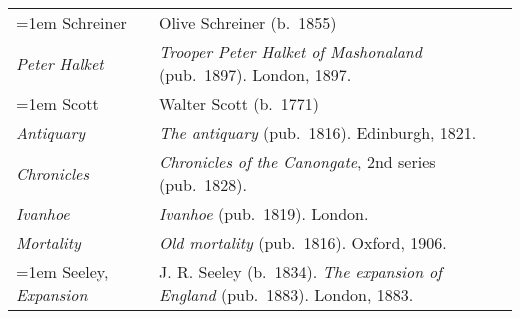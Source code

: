 \begin{xltabular}{\textwidth}{ lQ }
\hangindent=1em  Schreiner & Olive Schreiner (b.~1855) \\
\hspace{1em}\textit{Peter Halket} & \textit{Trooper Peter Halket of Mashonaland} (pub.~1897). London, 1897.\\

\hangindent=1em  Scott & Walter Scott (b.~1771) \\
\hspace{1em}\textit{Antiquary} & \textit{The antiquary} (pub.~1816). Edinburgh, 1821.  \\
\hspace{1em}\textit{Chronicles} & \textit{Chronicles of the Canongate}, 2nd series (pub.~1828). \\
\hspace{1em}\textit{Ivanhoe} & \textit{Ivanhoe} (pub.~1819). London. \\
\hspace{1em}\textit{Mortality} & \textit{Old mortality} (pub.~1816). Oxford, 1906. \\ %

\hangindent=1em  Seeley, \textit{Expansion} & J. R. Seeley (b.~1834). \textit{The expansion of England} (pub.~1883). London, 1883. \\


\end{xltabular}
